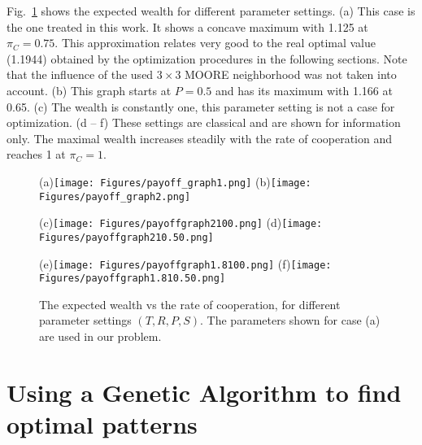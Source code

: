 \documentclass[10pt,a4paper]{article}  %
\begin{document}

Fig.~\ref{payoff_graph1} shows the expected wealth for different parameter settings.
(a) This case is the one treated in this work. 
It shows a concave maximum with 1.125 at  $\pi_C=0.75$.
This approximation relates very good to the real optimal value (1.1944) obtained by the optimization procedures
in the following sections. 
Note that the influence of the used $3 \times 3$ MOORE neighborhood was not taken into account.
(b) This graph starts at $P=0.5$ and has its maximum with 1.166 at 0.65.
(c) The wealth is constantly one, this parameter setting is not a case for optimization.
(d -- f) These settings are classical and are shown for information only. 
The maximal wealth increases steadily with the rate of cooperation 
and reaches 1 at $\pi_C=1$.


\begin{figure}[H] 
\centering
(a)\texttt{[image: Figures/payoff\_graph1.png]}
(b)\texttt{[image: Figures/payoff\_graph2.png]}		

(c)\texttt{[image: Figures/payoffgraph2100.png]}
(d)\texttt{[image: Figures/payoffgraph210.50.png]}

(e)\texttt{[image: Figures/payoffgraph1.8100.png]}
(f)\texttt{[image: Figures/payoffgraph1.810.50.png]} 	
\caption{
The expected wealth vs the rate of cooperation, for different
parameter settings $(T,R,P,S)$.
The parameters shown for case (a) are used in our problem.
}
\label{payoff_graph1}
\end{figure}

\section{Using a Genetic Algorithm to find optimal patterns}
\end{document}

